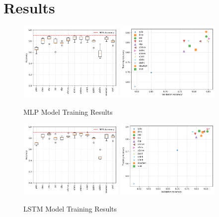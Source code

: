 \section{Results}

\begin{figure}[t]
    \centering
    \begin{minipage}{0.48\textwidth}
        \centering
        \includegraphics[width=0.45\textwidth]{../../assets/figures/mlp.training-results.boxplot.png}
        \includegraphics[width=0.45\textwidth]{../../assets/figures/mlp.training-results.scatter.png}
        \caption{MLP Model Training Results}
        \label{mlp.training-results}
    \end{minipage}
    \hfill
    \begin{minipage}{0.48\textwidth}
        \centering
        \includegraphics[width=0.45\textwidth]{../../assets/figures/lstm.training-results.boxplot.png}
        \includegraphics[width=0.45\textwidth]{../../assets/figures/lstm.training-results.scatter.png}
        \caption{LSTM Model Training Results}
        \label{lstm.training-results}
    \end{minipage}
\end{figure}

